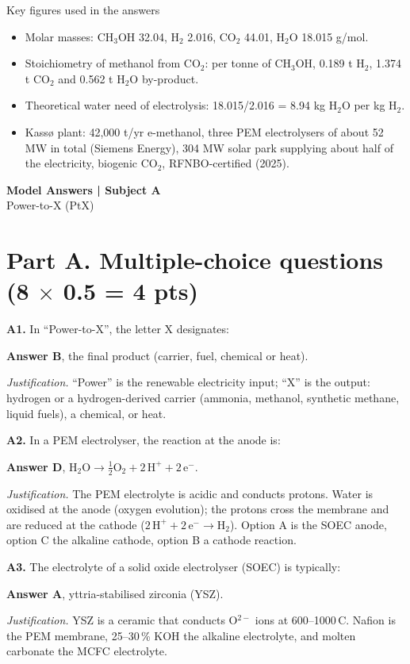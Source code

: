 \documentclass[11pt,a4paper]{article}
\newcommand{\degC}{\,\textdegree C}
\newcommand{\q}[2]{\par\medskip\textbf{#1.} #2\par}
\newcommand{\answer}[2]{\textcolor{ans}{\textbf{Answer #1}}, #2\par}
\newcommand{\why}[1]{\textit{Justification.} #1\par}
\newcommand{\pts}[1]{\hfill{\normalsize\textbf{(#1)}}}
\begin{document}
\medskip
\begin{keybox}{Key figures used in the answers}
\begin{itemize}
  \item Molar masses: CH$_3$OH 32.04, H$_2$ 2.016, CO$_2$ 44.01, H$_2$O 18.015 g/mol.
  \item Stoichiometry of methanol from CO$_2$: per tonne of CH$_3$OH, 0.189 t H$_2$, 1.374 t CO$_2$
        and 0.562 t H$_2$O by-product.
  \item Theoretical water need of electrolysis: 18.015/2.016 = 8.94 kg H$_2$O per kg H$_2$.
  \item Kassø plant: 42,000 t/yr e-methanol, three PEM electrolysers of about 52 MW in total (Siemens Energy),
        304 MW solar park supplying about half of the electricity, biogenic CO$_2$, RFNBO-certified (2025).
\end{itemize}
\end{keybox}

\clearpage
\begin{center}
{\LARGE\bfseries Model Answers | Subject A}\\[3pt]
{\large Power-to-X (PtX)}
\end{center}

\section{Part A. Multiple-choice questions \pts{8 $\times$ 0.5 = 4 pts}}

\q{A1}{In ``Power-to-X'', the letter X designates:}
\answer{B}{the final product (carrier, fuel, chemical or heat).}
\why{``Power'' is the renewable electricity input; ``X'' is the output: hydrogen or a hydrogen-derived carrier
(ammonia, methanol, synthetic methane, liquid fuels), a chemical, or heat.}

\q{A2}{In a PEM electrolyser, the reaction at the anode is:}
\answer{D}{$\mathrm{H_2O \longrightarrow \tfrac{1}{2}O_2 + 2\,H^+ + 2\,e^-}$.}
\why{The PEM electrolyte is acidic and conducts protons. Water is oxidised at the anode (oxygen evolution);
the protons cross the membrane and are reduced at the cathode ($\mathrm{2\,H^+ + 2\,e^- \rightarrow H_2}$).
Option A is the SOEC anode, option C the alkaline cathode, option B a cathode reaction.}

\q{A3}{The electrolyte of a solid oxide electrolyser (SOEC) is typically:}
\answer{A}{yttria-stabilised zirconia (YSZ).}
\why{YSZ is a ceramic that conducts O$^{2-}$ ions at 600--1000\degC. Nafion is the PEM membrane, 25--30\,\% KOH
the alkaline electrolyte, and molten carbonate the MCFC electrolyte.}
\end{document}
